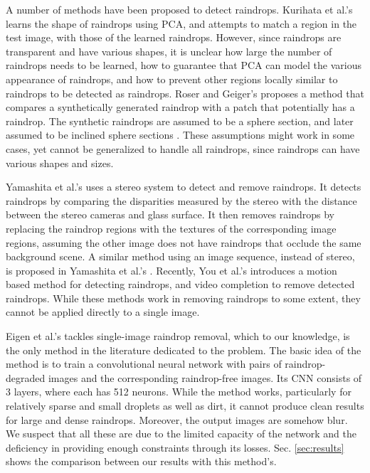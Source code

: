 \documentclass[10pt,twocolumn,letterpaper]{article}
\begin{document}
A number of methods have been proposed to detect raindrops. Kurihata et al.'s \cite{kurihata2005rainy} learns the shape of raindrops using PCA, and attempts to match a region in the test image, with those of the learned raindrops. However, since raindrops are transparent and have various shapes, it is unclear how large the number of raindrops needs to be learned, how to guarantee that PCA can model the various appearance of raindrops, and how to prevent other regions locally similar to raindrops to be detected as raindrops. Roser and Geiger's \cite{roser2009video} proposes a method that compares a synthetically generated raindrop with a patch that potentially has a raindrop. The synthetic raindrops are assumed to be a sphere section, and later  assumed to be inclined sphere sections \cite{roser2010realistic}. These assumptions might work in some cases, yet cannot be generalized to handle all raindrops, since raindrops can have various shapes and sizes.

Yamashita et al.'s \cite{yamashita2005removal} uses a stereo system to detect and remove raindrops. It detects raindrops by comparing  the disparities measured by the stereo with the distance between the stereo cameras and glass surface. It then removes raindrops by replacing the raindrop regions with the  textures of the corresponding image regions, assuming the other image does not have raindrops that occlude the same background scene. A similar method using an image sequence, instead of stereo, is proposed in Yamashita et al.'s \cite{yamashita2009noises}. Recently, You et al.'s \cite{you2016adherent} introduces a motion based method for detecting raindrops, and video completion to remove detected raindrops. While these methods work in removing raindrops  to some extent, they cannot be applied directly to a single image. 

Eigen et al.'s \cite{eigen2013restoring} tackles  single-image raindrop removal, which to our knowledge, is the only method  in the literature dedicated to the problem. The basic idea of the method is to train a convolutional neural network with pairs of raindrop-degraded images and the corresponding raindrop-free images. Its CNN consists of 3 layers, where each has 512 neurons. While the method works, particularly for relatively sparse and small droplets as well as dirt, it cannot produce  clean results for large and dense raindrops.  Moreover, the output images are somehow blur. We suspect that all these are due to the limited capacity of the network and the deficiency in providing enough constraints through its losses. Sec. \ref{sec:results} shows the comparison between our results with this method's.
\end{document}
